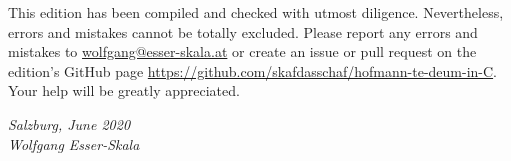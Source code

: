 \documentclass[parskip=full]{scrreprt}
\newif\iftemplate\templatetrue
\begin{document}
This edition has been compiled and checked with utmost diligence. Nevertheless, errors and mistakes cannot be totally excluded. Please report any errors and mistakes to \url{wolfgang@esser-skala.at} or create an issue or pull request on the edition’s GitHub page \url{https://github.com/skafdasschaf/hofmann-te-deum-in-C}. Your help will be greatly appreciated.

\bigskip
\textit{Salzburg, June 2020\\
Wolfgang Esser-Skala}

\cleardoublepage
\fi

\iftemplate

\fi
\end{document}
